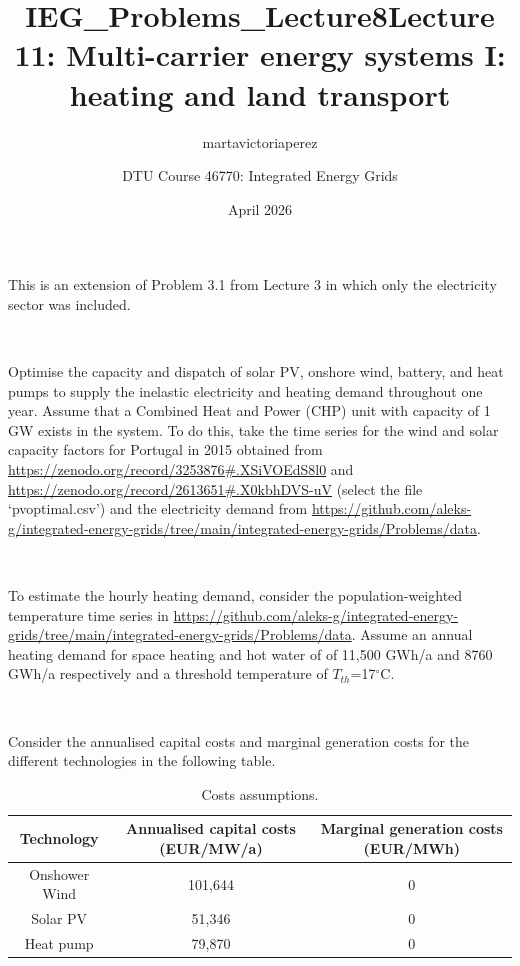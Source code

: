 \documentclass[10pt]{article}
\title{IEG_Problems_Lecture8}
\author{martavictoriaperez }
\date{April 2026}
\newenvironment{problem}[2][Problem]{\begin{trivlist}
\item[\hskip \labelsep {\bfseries #1}\hskip \labelsep {\bfseries #2.}]}{\end{trivlist}}
\begin{document}
 
\title{\textbf{Lecture 11: Multi-carrier energy systems I: heating and land transport}}
\author{DTU Course 46770: Integrated Energy Grids }
\maketitle

\begin{problem}{11.1}

This is an extension of Problem 3.1 from Lecture 3 in which only the electricity sector was included.

\

Optimise the capacity and dispatch of solar PV, onshore wind, battery, and heat pumps to supply the inelastic electricity and heating demand throughout one year. Assume that a Combined Heat and Power (CHP) unit with capacity of 1 GW exists in the system. To do this, take the time series for the wind and solar capacity factors for Portugal in 2015 obtained from \url{https://zenodo.org/record/3253876#.XSiVOEdS8l0}
and \url{https://zenodo.org/record/2613651#.X0kbhDVS-uV} (select the file ‘pvoptimal.csv’) and the electricity demand from \url{https://github.com/aleks-g/integrated-energy-grids/tree/main/integrated-energy-grids/Problems/data}.

\

To estimate the hourly heating demand, consider the population-weighted temperature time series in \url{https://github.com/aleks-g/integrated-energy-grids/tree/main/integrated-energy-grids/Problems/data}. Assume an annual heating demand for space heating and hot water of of 11,500 GWh/a and 8760 GWh/a respectively and a threshold temperature of $T_{th}$=17$^{\circ}$C.

\

Consider the annualised capital costs and marginal generation costs for the different technologies in the following table. 

\begin{table}[h]
    \centering
    \begin{tabular}{ccc}
    \hline
        Technology & Annualised capital costs (EUR/MW/a) & Marginal generation costs (EUR/MWh) \\
    \hline
    Onshower Wind &  101,644 & 0 \\
         Solar PV &  51,346 & 0 \\
         Heat pump & 79,870 &  0  \\
    \hline
    \end{tabular}
    \caption{Costs assumptions.}
    \label{tab:my_label}
\end{table}


\end{problem}
\end{document}
